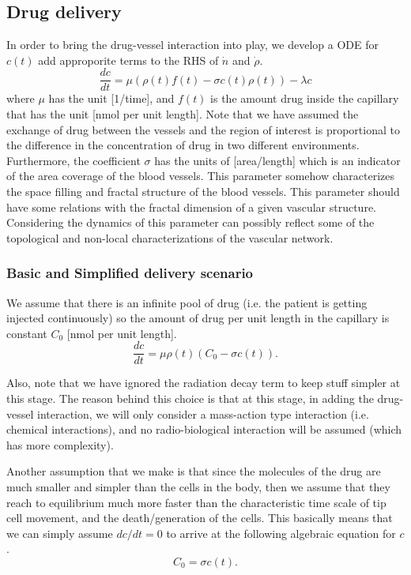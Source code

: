 \subsection*{Drug delivery}
In order to bring the drug-vessel interaction into play, we develop a ODE for $c(t)$ add approporite terms to the RHS of $\dot{n}$ and $\dot{\rho}$.
\[ \frac{dc}{dt} = \mu (\rho(t)f(t) - \sigma c(t)\rho(t)) - \boxed{\lambda c} \]
where $\mu$ has the unit [1/time], and $f(t)$ is the amount drug inside the capillary that has the unit [nmol per unit length]. Note that we have assumed the exchange of drug between the vessels and the region of interest is proportional to the difference in the concentration of drug in two different environments. Furthermore, the coefficient $\sigma$ has the units of [area/length] which is an indicator of the area coverage of the blood vessels. This parameter somehow characterizes the space filling and fractal structure of the blood vessels. This parameter should have some relations with the fractal dimension of a given vascular structure. Considering the dynamics of this parameter can possibly reflect some of the topological and non-local characterizations of the vascular network.

\subsubsection*{Basic and Simplified delivery scenario}
We assume that there is an infinite pool of drug (i.e. the patient is getting injected continuously) so the amount of drug per unit length in the capillary is constant $C_0$ [nmol per unit length].
\[ \frac{dc}{dt} = \mu \rho(t)(C_0 - \sigma c(t)).  \]

Also, note that we have ignored the radiation decay term to keep stuff simpler at this stage. The reason behind this choice is that at this stage, in adding the drug-vessel interaction, we will only consider a mass-action type interaction (i.e. chemical interactions), and no radio-biological interaction will be assumed (which has more complexity).

Another assumption that we make is that since the molecules of the drug are much smaller and simpler than the cells in the body, then we assume that they reach to equilibrium much more faster than the characteristic time scale of tip cell movement, and the death/generation of the cells. This basically means that we can simply assume $dc/dt=0$ to arrive at the following algebraic equation for $c$.
\[ C_0 = \sigma c(t). \]

